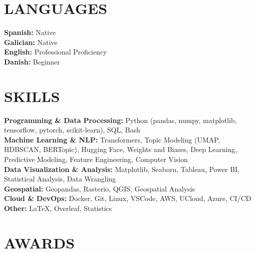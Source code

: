 \documentclass{resume}
\begin{document}
\section{LANGUAGES} 
\begin{content}
    {\bf Spanish:} Native \\
    {\bf Galician:} Native \\
    {\bf English:} Professional Proficiency  \\
    {\bf Danish:} Beginner \\
\end{content}

\section{SKILLS} 
\begin{content}
    {\bf Programming \& Data Processing:} Python {\footnotesize (pandas, numpy, matplotlib, tensorflow, pytorch, scikit-learn)}, SQL, Bash \\
    {\bf Machine Learning \& NLP:} Transformers, Topic Modeling {\footnotesize (UMAP, HDBSCAN, BERTopic)}, Hugging Face, Weights and Biases, Deep Learning, Predictive Modeling, Feature Engineering, Computer Vision \\
    {\bf Data Visualization \& Analysis:} Matplotlib, Seaborn, Tableau, Power BI, Statistical Analysis, Data Wrangling \\
    {\bf Geospatial:} Geopandas, Rasterio, QGIS, Geospatial Analysis \\
    {\bf Cloud \& DevOps:} Docker, Git, Linux, VSCode, AWS, UCloud, Azure, CI/CD \\
    {\bf Other:} \LaTeX, Overleaf, Statistics \\
\end{content}


\section{AWARDS}
\begin{content}
     \\
     \\
\end{content}
\end{document}
